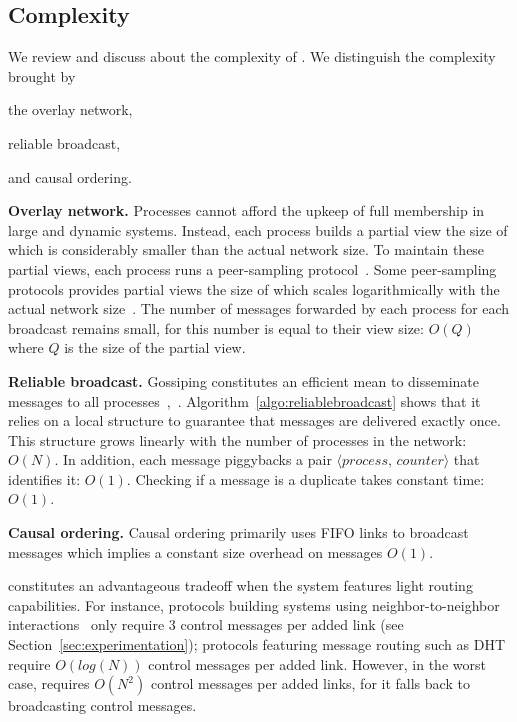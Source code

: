 \subsection{Complexity}
\label{subsec:complexity}

We review and discuss about the complexity of \CBROADCAST. We distinguish the
complexity brought by 
\begin{inparaenum}[(i)]
\item the overlay network,
\item reliable broadcast,
\item and causal ordering.
\end{inparaenum}

\noindent \textbf{Overlay network.} Processes cannot afford the upkeep of full
membership in large and dynamic systems. Instead, each process builds a partial
view the size of which is considerably smaller than the actual network size.  To
maintain these partial views, each process runs a peer-sampling
protocol~\cite{bertier-d2ht,jelasity2007gossip,jelasity2009tman}.  Some
peer-sampling protocols provides partial views the size of which scales
logarithmically with the actual network size~\cite{nedelec2017adaptive}.  The
number of messages forwarded by each process for each broadcast remains small,
for this number is equal to their view size: $O(Q)$ where $Q$ is the size of the
partial view.


\noindent \textbf{Reliable broadcast.} Gossiping constitutes an efficient mean
to disseminate messages to all
processes~\cite{demers1987epidemic},~\cite{birman1999bimodal}.
Algorithm~\ref{algo:reliablebroadcast} shows that it relies on a local structure
to guarantee that messages are delivered exactly once. This structure grows
linearly with the number of processes in the network: $O(N)$. In addition, each
message piggybacks a pair $\langle process,\, counter \rangle$ that identifies
it: $O(1)$. Checking if a message is a duplicate takes constant time: $O(1)$.

\noindent \textbf{Causal ordering.} Causal ordering primarily uses FIFO links to
broadcast messages which implies a constant size overhead on messages $O(1)$.

\noindent \CBROADCAST constitutes an advantageous tradeoff when the system
features light routing capabilities. For instance, protocols building systems
using neighbor-to-neighbor
interactions~\cite{jelasity2007gossip,jelasity2009tman,nedelec2017adaptive} only
require 3 control messages per added link (see
Section~\ref{sec:experimentation}); protocols featuring message routing such as
DHT require $O(log(N))$ control messages per added link. However, in the worst
case, \CBROADCAST requires $O(N^2)$ control messages per added links, for it
falls back to broadcasting control messages.



